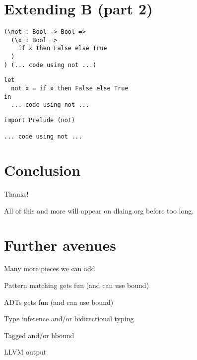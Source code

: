 \documentclass[aspectration=169]{beamer}
\begin{document}
\section{Extending B (part 2)}

\begin{frame}[fragile]
  \begin{verbatim}
(\not : Bool -> Bool => 
  (\x : Bool => 
    if x then False else True
  )
) (... code using not ...)
  \end{verbatim}  
\end{frame}

\begin{frame}[fragile]
  \begin{verbatim}
let 
  not x = if x then False else True
in
  ... code using not ...
  \end{verbatim}  
\end{frame}

\begin{frame}[fragile]
  \begin{verbatim}
import Prelude (not)

... code using not ...
  \end{verbatim}  
\end{frame}

\section{Conclusion}

\begin{frame}[c]
Thanks!
\end{frame}
  
\begin{frame}[c]
All of this and more will appear on dlaing.org before too long. 
\end{frame}

\section{Further avenues}

\begin{frame}[c]
Many more pieces we can add
\end{frame}

\begin{frame}[c]
Pattern matching gets fun (and can use bound)
\end{frame}

\begin{frame}[c]
ADTs gets fun (and can use bound)
\end{frame}

\begin{frame}[c]
Type inference and/or bidirectional typing
\end{frame}

\begin{frame}[c]
Tagged and/or hbound
\end{frame}

\begin{frame}[c]
LLVM output
\end{frame}
\end{document}
